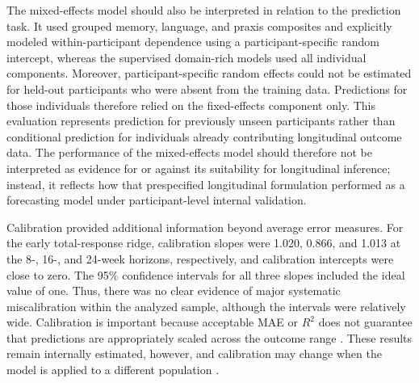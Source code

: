 \documentclass[11pt]{article}
\begin{document}
The mixed-effects model should also be interpreted in relation to the prediction task. It used grouped memory, language, and praxis composites and explicitly modeled within-participant dependence using a participant-specific random intercept, whereas the supervised domain-rich models used all individual components. Moreover, participant-specific random effects could not be estimated for held-out participants who were absent from the training data. Predictions for those individuals therefore relied on the fixed-effects component only. This evaluation represents prediction for previously unseen participants rather than conditional prediction for individuals already contributing longitudinal outcome data. The performance of the mixed-effects model should therefore not be interpreted as evidence for or against its suitability for longitudinal inference; instead, it reflects how that prespecified longitudinal formulation performed as a forecasting model under participant-level internal validation.

Calibration provided additional information beyond average error measures. For the early total-response ridge, calibration slopes were 1.020, 0.866, and 1.013 at the 8-, 16-, and 24-week horizons, respectively, and calibration intercepts were close to zero. The 95\% confidence intervals for all three slopes included the ideal value of one. Thus, there was no clear evidence of major systematic miscalibration within the analyzed sample, although the intervals were relatively wide. Calibration is important because acceptable MAE or $R^2$ does not guarantee that predictions are appropriately scaled across the outcome range \citep{vancalster2019calibration}. These results remain internally estimated, however, and calibration may change when the model is applied to a different population \citep{ramspek2021external}.
\end{document}
